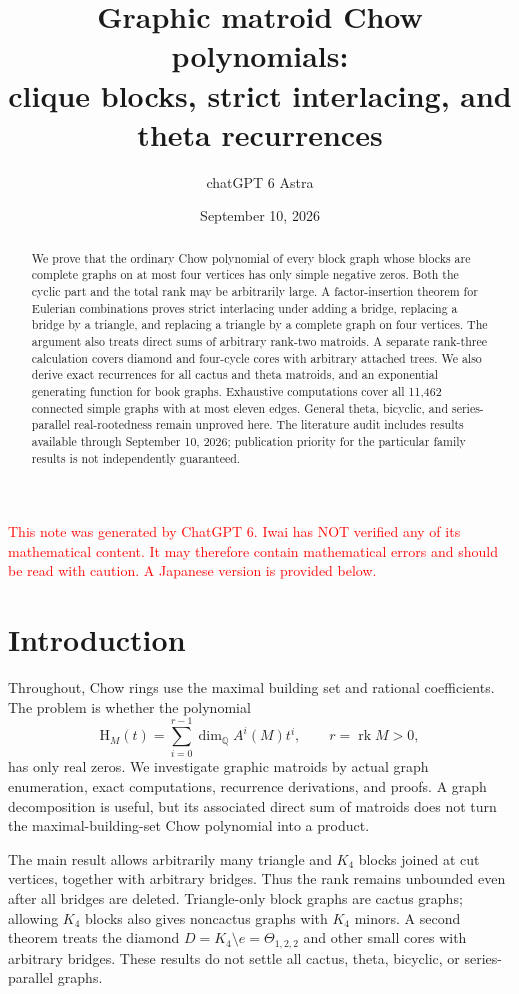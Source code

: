 \documentclass[12pt]{amsart}
\title[Graphic matroid Chow polynomials]{Graphic matroid Chow polynomials:\\clique blocks, strict interlacing, and theta recurrences}
\author{chatGPT 6 Astra}
\date{September 10, 2026}
\theoremstyle{definition}
\theoremstyle{remark}
\numberwithin{equation}{section}
\newcommand{\rk}{\operatorname{rk}}
\newcommand{\Q}{\mathbb{Q}}
\newcommand{\xr}[1]{\textcolor{red}{#1}}
\newcommand{\HCh}{\mathrm{H}}
\begin{document}
\begin{abstract}
We prove that the ordinary Chow polynomial of every block graph whose blocks are complete graphs on at most four vertices has only simple negative zeros. Both the cyclic part and the total rank may be arbitrarily large. A factor-insertion theorem for Eulerian combinations proves strict interlacing under adding a bridge, replacing a bridge by a triangle, and replacing a triangle by a complete graph on four vertices. The argument also treats direct sums of arbitrary rank-two matroids. A separate rank-three calculation covers diamond and four-cycle cores with arbitrary attached trees. We also derive exact recurrences for all cactus and theta matroids, and an exponential generating function for book graphs. Exhaustive computations cover all 11,462 connected simple graphs with at most eleven edges. General theta, bicyclic, and series-parallel real-rootedness remain unproved here. The literature audit includes results available through September 10, 2026; publication priority for the particular family results is not independently guaranteed.
\end{abstract}
\maketitle
\setcounter{tocdepth}{1}
\tableofcontents

\xr{This note was generated by ChatGPT 6. Iwai has NOT verified any of its mathematical content. It may therefore contain mathematical errors and should be read with caution. A Japanese version is provided below.}


\section{Introduction}
Throughout, Chow rings use the maximal building set and rational coefficients. The problem is whether the polynomial
\[
 \HCh_M(t)=\sum_{i=0}^{r-1}\dim_{\Q} A^i(M)t^i,
 \qquad r=\rk M>0,
\]
has only real zeros. We investigate graphic matroids by actual graph enumeration, exact computations, recurrence derivations, and proofs. A graph decomposition is useful, but its associated direct sum of matroids does not turn the maximal-building-set Chow polynomial into a product.

The main result allows arbitrarily many triangle and $K_4$ blocks joined at cut vertices, together with arbitrary bridges. Thus the rank remains unbounded even after all bridges are deleted. Triangle-only block graphs are cactus graphs; allowing $K_4$ blocks also gives noncactus graphs with $K_4$ minors. A second theorem treats the diamond $D=K_4\setminus e=\Theta_{1,2,2}$ and other small cores with arbitrary bridges. These results do not settle all cactus, theta, bicyclic, or series-parallel graphs.
\end{document}
